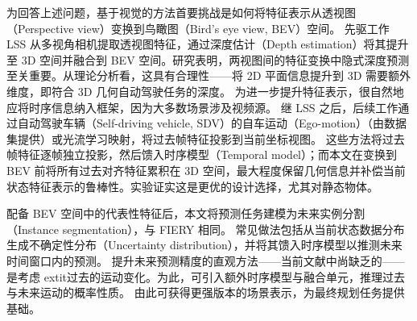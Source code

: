 \documentclass[runningheads]{llncs}
\begin{document}
为回答上述问题，基于视觉的方法首要挑战是如何将特征表示从透视图（Perspective view）变换到鸟瞰图（Bird's eye view, BEV）空间。
%
先驱工作 LSS\cite{philion2020lift} 从多视角相机提取透视图特征，通过深度估计（Depth estimation）将其提升至 3D 空间并融合到 BEV 空间。研究表明，两视图间的特征变换中隐式深度预测至关重要\cite{hu2021fiery,wang2021learning,reading2021CaDDN}。从理论分析看，这具有合理性——将 2D 平面信息提升到 3D 需要额外维度，即符合 3D 几何自动驾驶任务的深度。
%
为进一步提升特征表示，很自然地应将时序信息纳入框架，因为大多数场景涉及视频源。
继 LSS\cite{philion2020lift} 之后，后续工作通过自动驾驶车辆（Self-driving vehicle, SDV）的自车运动（Ego-motion）（由数据集提供）\cite{hu2021fiery}或光流学习映射\cite{wang2021learning}，将过去帧特征投影到当前坐标视图。
%
这些方法将过去帧特征逐帧独立投影，然后馈入时序模型（Temporal model）；而本文在变换到 BEV 前将所有过去对齐特征累积在 3D 空间，最大程度保留几何信息并补偿当前状态特征表示的鲁棒性。实验证实这是更优的设计选择，尤其对静态物体。











配备 BEV 空间中的代表性特征后，本文将预测任务建模为未来实例分割（Instance segmentation），与 FIERY\cite{hu2021fiery} 相同。
%
常见做法包括从当前状态数据分布生成不确定性分布（Uncertainty distribution），并将其馈入时序模型以推测未来时间窗口内的预测\cite{hu2021fiery,wang2021learning}。
%
提升未来预测精度的直观方法——当前文献中尚缺乏的——是考虑	extit{过去}的运动变化。为此，可引入额外时序模型与融合单元，推理过去与未来运动的概率性质。
%
由此可获得更强版本的场景表示，为最终规划任务提供基础。
\end{document}
